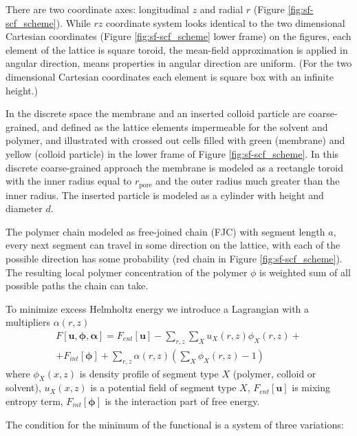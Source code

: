 \documentclass[12pt, a4paper]{article}
\begin{document}
There are two coordinate axes: longitudinal $z$ and radial $r$ (Figure \ref{fig:sf-scf_scheme}). 
While $rz$ coordinate system looks identical to the two dimensional Cartesian coordinates (Figure \ref{fig:sf-scf_scheme} lower frame) on the figures, each element of the lattice is square toroid, the mean-field approximation is applied in angular direction, means properties in angular direction are uniform.
(For the two dimensional Cartesian coordinates each element is square box with an infinite height.)

In the discrete space the membrane and an inserted colloid particle are coarse-grained, and defined as the lattice elements impermeable for the solvent and polymer, and illustrated with crossed out cells filled with green (membrane) and yellow (colloid particle) in  the lower frame of Figure \ref{fig:sf-scf_scheme}.
In this discrete coarse-grained approach the membrane is modeled as a rectangle toroid with the inner radius equal to $r_{\textrm{pore}}$ and the outer radius much greater than the inner radius.
The inserted particle is modeled as a cylinder with height and diameter $d$.

The polymer chain modeled as free-joined chain (FJC) with segment length $a$, every next segment can travel in some direction on the lattice, with each of the possible direction has some probability (red chain in Figure \ref{fig:sf-scf_scheme}).
The resulting local polymer concentration of the polymer $\phi$ is weighted sum of all possible paths the chain can take.


To minimize excess Helmholtz energy we introduce a Lagrangian with a multipliers $\alpha(r,z)$
\begin{equation}
    \begin{split}
    F[\mathbf{u}, \boldsymbol{\phi}, \boldsymbol{\alpha}] = F_{ent}[\mathbf{u}] - \sum\limits_{r,z} \sum\limits_X u_X(r, z) \phi_X(r, z) + \\
    + F_{int} [\boldsymbol{\phi}] 
    + \sum\limits_{r,z} \alpha(r, z) \left( \sum\limits_X \phi_X(r, z) - 1 \right)
    \end{split} 
\end{equation}
where $\phi_X(x, z)$ is density profile of segment type $X$ (polymer, colloid or solvent), $u_X(x, z)$ is a potential field of segment type $X$, $F_{ent}[\mathbf{u}]$ is mixing entropy term, $F_{int} [\boldsymbol{\phi}]$ is the interaction part of free energy. 

The condition for the minimum of the functional is a system of three variations:
\end{document}
